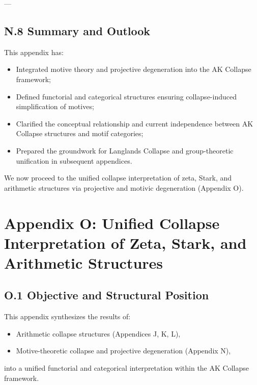 \documentclass[11pt]{article}
\begin{document}
---

\subsection*{N.8 Summary and Outlook}

This appendix has:
\begin{itemize}
  \item Integrated motive theory and projective degeneration into the AK Collapse framework;
  \item Defined functorial and categorical structures ensuring collapse-induced simplification of motives;
  \item Clarified the conceptual relationship and current independence between AK Collapse structures and motif categories;
  \item Prepared the groundwork for Langlands Collapse and group-theoretic unification in subsequent appendices.
\end{itemize}

We now proceed to the unified collapse interpretation of zeta, Stark, and arithmetic structures via projective and motivic degeneration (Appendix O).




\section*{Appendix O: Unified Collapse Interpretation of Zeta, Stark, and Arithmetic Structures}

\subsection*{O.1 Objective and Structural Position}

This appendix synthesizes the results of:
\begin{itemize}
  \item Arithmetic collapse structures (Appendices J, K, L),
  \item Motive-theoretic collapse and projective degeneration (Appendix N),
\end{itemize}
into a unified functorial and categorical interpretation within the AK Collapse framework.
\end{document}
